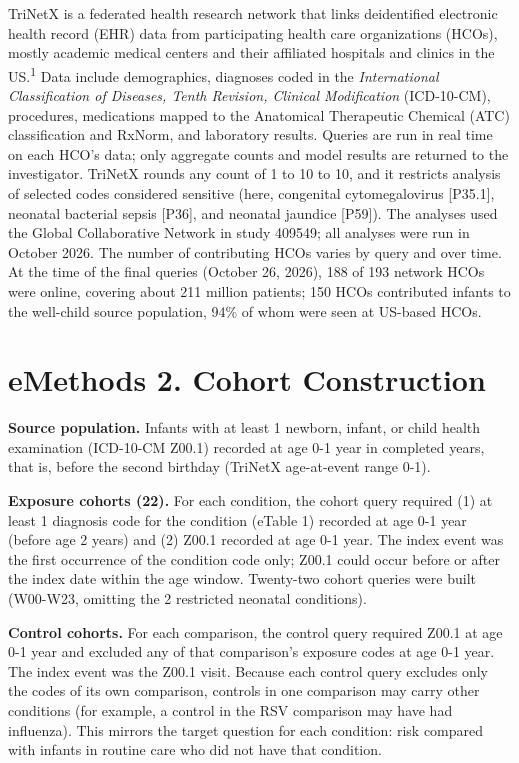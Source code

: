 \documentclass[11pt]{article}
\begin{document}
TriNetX is a federated health research network that links
deidentified electronic health record (EHR) data from
participating health care organizations (HCOs), mostly
academic medical centers and their affiliated hospitals and
clinics in the US.\textsuperscript{1} Data include
demographics, diagnoses coded in the \emph{International
Classification of Diseases, Tenth Revision, Clinical
Modification} (ICD-10-CM), procedures, medications mapped to
the Anatomical Therapeutic Chemical (ATC) classification and
RxNorm, and laboratory results. Queries are run in real time
on each HCO's data; only aggregate counts and model results
are returned to the investigator. TriNetX rounds any count
of 1 to 10 to 10, and it restricts analysis of selected
codes considered sensitive (here, congenital cytomegalovirus
{[}P35.1{]}, neonatal bacterial sepsis {[}P36{]}, and
neonatal jaundice {[}P59{]}). The analyses used the Global
Collaborative Network in study 409549; all analyses were run
in October 2026. The number of contributing HCOs varies by
query and over time. At the time of the final queries
(October 26, 2026), 188 of 193 network HCOs were online,
covering about 211 million patients; 150 HCOs contributed
infants to the well-child source population, 94\% of whom
were seen at US-based HCOs.

\hypertarget{emethods-2.-cohort-construction}{%
\section*{eMethods 2. Cohort
Construction}\label{emethods-2.-cohort-construction}}

\textbf{Source population.} Infants with at least 1 newborn,
infant, or child health examination (ICD-10-CM Z00.1)
recorded at age 0-1 year in completed years, that is, before
the second birthday (TriNetX age-at-event range 0-1).

\textbf{Exposure cohorts (22).} For each condition, the
cohort query required (1) at least 1 diagnosis code for the
condition (eTable 1) recorded at age 0-1 year (before age 2
years) and (2) Z00.1 recorded at age 0-1 year. The index
event was the first occurrence of the condition code only;
Z00.1 could occur before or after the index date within the
age window. Twenty-two cohort queries were built (W00-W23,
omitting the 2 restricted neonatal conditions).

\textbf{Control cohorts.} For each comparison, the control
query required Z00.1 at age 0-1 year and excluded any of
that comparison's exposure codes at age 0-1 year. The index
event was the Z00.1 visit. Because each control query
excludes only the codes of its own comparison, controls in
one comparison may carry other conditions (for example, a
control in the RSV comparison may have had influenza). This
mirrors the target question for each condition: risk
compared with infants in routine care who did not have that
condition.
\end{document}
